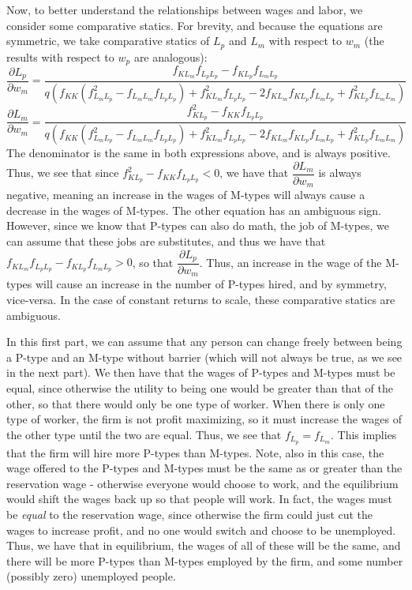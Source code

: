 \documentclass[12pt]{article}
\newcommand{\qpartial}[2]{\dfrac{\partial #1}{\partial #2}}
\begin{document}
\begin{enumerate}
Now, to better understand the relationships between wages and labor, we consider some comparative statics.  For brevity, and because the equations are symmetric, we take comparative statics of $L_p$ and $L_m$ with respect to $w_m$ (the results with respect to $w_p$ are analogous):
$$
  \qpartial{L_p}{w_m} = \frac{f_{K L_m} f_{L_p L_p} - f_{K L_p} f_{L_m L_p}}{q \left(f_{K K}
   \left(f_{L_m L_p}^2-f_{L_m L_m} f_{L_p L_p} \right) + f_{K L_m} ^2 f_{L_p L_p}-2
   f_{K L_m} f_{K L_p} f_{L_m L_p} + f_{K L_p}^2 f_{L_m L_m}\right)}
$$
$$
	\qpartial{L_m}{w_m} = \frac{f_{K L_p}^2-f_{KK} f_{L_p L_p}}{q \left(f_{KK}
   \left(f_{L_m L_p}^2-f_{L_m L_m} f_{L_p L_p}\right)+f_{K L_m}^2 f_{L_p L_p}-2
   f_{K L_m} f_{K L_p} f_{L_m L_p}+f_{K L_p}^2 f_{L_m L_m}\right)}
$$
The denominator is the same in both expressions above, and is always positive.  Thus, we see that since $f_{K L_p}^2-f_{KK} f_{L_p L_p} < 0$, we have that $\qpartial{L_m}{w_m}$ is always negative, meaning an increase in the wages of M-types will always cause a decrease in the wages of M-types.  The other equation has an ambiguous sign.  However, since we know that P-types can also do math, the job of M-types, we can assume that these jobs are substitutes, and thus we have that $f_{K L_m} f_{L_p L_p} - f_{K L_p} f_{L_m L_p} > 0$, so that $\qpartial{L_p}{w_m}$.  Thus, an increase in the wage of the M-types will cause an increase in the number of P-types hired, and by symmetry, vice-versa.  In the case of constant returns to scale, these comparative statics are ambiguous.  

In this first part, we can assume that any person can change freely between being a P-type and an M-type without barrier (which will not always be true, as we see in the next part). We then have that the wages of P-types and M-types must be equal, since otherwise the utility to being one would be greater than that of the other, so that there would only be one type of worker.  When there is only one type of worker, the firm is not profit maximizing, so it must increase the wages of the other type until the two are equal.  Thus, we see that $f_{L_p} = f_{L_m}$.  This implies that the firm will hire more P-types than M-types.  Note, also in this case, the wage offered to the P-types and M-types must be the same as or greater than the reservation wage - otherwise everyone would choose to work, and the equilibrium would shift the wages back up so that people will work.  In fact, the wages must be \textit{equal} to the reservation wage, since otherwise the firm could just cut the wages to increase profit, and no one would switch and choose to be unemployed.  Thus, we have that in equilibrium, the wages of all of these will be the same, and there will be more P-types than M-types employed by the firm, and some number (possibly zero) unemployed people.   
 


\end{enumerate}
\end{document}
